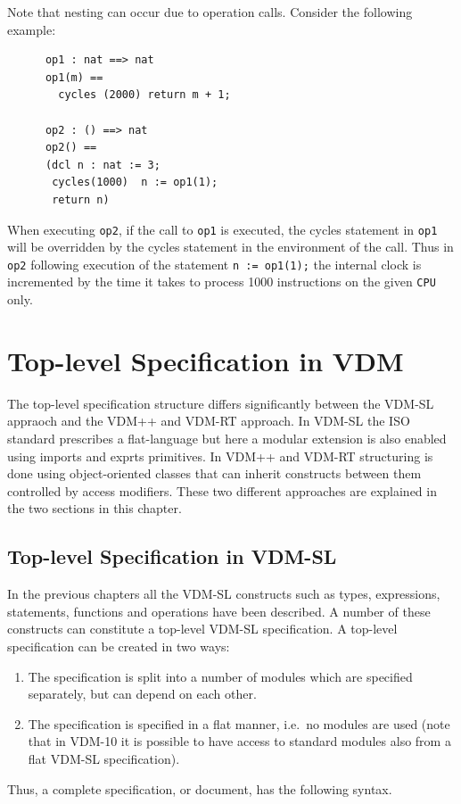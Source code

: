 \documentclass{overturerepchap}
\begin{document}
\begin{description}
Note that nesting can occur due to operation calls. Consider the
following example:
\begin{lstlisting}
      op1 : nat ==> nat
      op1(m) ==
        cycles (2000) return m + 1;

      op2 : () ==> nat
      op2() ==
      (dcl n : nat := 3;
       cycles(1000)  n := op1(1);
       return n) 
\end{lstlisting}
When executing \texttt{op2}, if the call to \texttt{op1} is
executed, the cycles statement in \texttt{op1} will be overridden by
the cycles statement in the environment of the call. Thus in
\texttt{op2} following execution of the statement 
\texttt{n := op1(1);} the internal clock is incremented by the time
it takes to process 1000 instructions on the given \texttt{CPU}
only. 
\end{description}


\chapter{Top-level Specification in VDM}
\label{top-level}

The top-level specification structure differs significantly between
the VDM-SL appraoch and the VDM++ and VDM-RT approach. In VDM-SL the
ISO standard prescribes a flat-language but here a modular extension
is also enabled using imports and exprts primitives. In VDM++ and
VDM-RT structuring is done using object-oriented classes that can
inherit constructs between them controlled by access modifiers. These
two different approaches are explained in the two sections in this
chapter. 

\section{Top-level Specification in VDM-SL}\label{modules}

In the previous chapters all the  VDM-SL constructs such as types,
expressions, statements, functions and operations have been described. A
number of these constructs can constitute a top-level  VDM-SL
specification. A top-level specification can be created in two ways:
\begin{enumerate}
\item The specification is split into a number of modules which are
  specified separately, but can depend on each other.
\item The specification is specified in a flat manner, i.e.\ no modules are
  used (note that in VDM-10 it is possible to have access to standard
  modules also from a flat VDM-SL specification).
\end{enumerate}
Thus, a complete specification, or document, has the following syntax.
\end{document}
